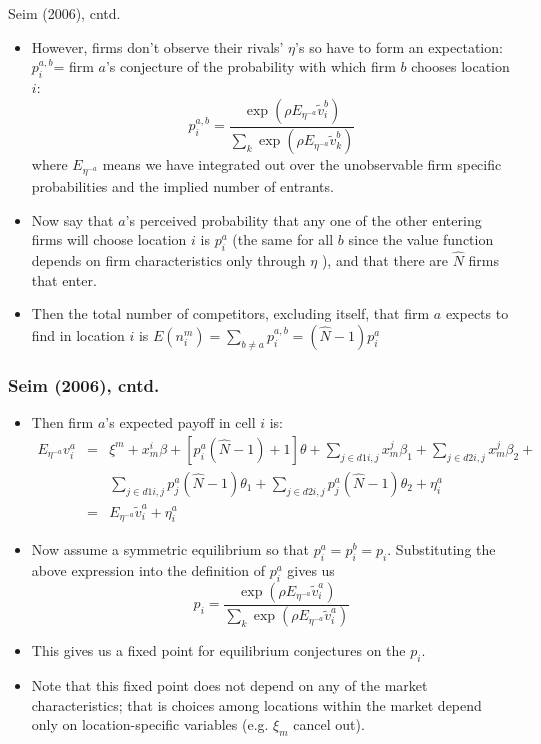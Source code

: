 \documentclass[xcolor=pdftex,dvipsnames,table,mathserif]{beamer}
\begin{document}
\begin{frame}{Seim (2006), cntd.}
\footnotesize
\begin{itemize}
\item However, firms don't observe their rivals' $\eta $'s so have to form
an expectation:\ $p_{i}^{a,b}$= firm $a$'s conjecture of the probability
with which firm $b$ chooses location $i$:%
\begin{equation*}
p_{i}^{a,b}=\frac{\exp (\rho E_{\eta ^{-a}}\tilde{v}_{i}^{b})}{\sum_{k}\exp
(\rho E_{\eta ^{-a}}\tilde{v}_{k}^{b})}
\end{equation*}%
where $E_{\eta ^{-a}}$ means we have integrated out over the unobservable
firm specific probabilities and the implied number of entrants.

\item Now say that $a$'s perceived probability that any one of the other
entering firms will choose location $i$ is $p_{i}^{a}$ (the same for all $b$
since the value function depends on firm characteristics only through $\eta $%
), and that there are $\hat{N}$ firms that enter.

\item Then the total number of competitors, excluding itself, that firm $a$
expects to find in location $i$ is $E(n_{i}^{m})=\sum_{b\neq a}p_{i}^{a,b}=(%
\hat{N}-1)p_{i}^{a}$
\end{itemize}
\end{frame}

\begin{frame}
\frametitle{Seim (2006), cntd.}
\footnotesize
\begin{itemize}
\item Then firm $a$'s expected payoff in cell $i$ is: 
\begin{eqnarray*}
E_{\eta ^{-a}}v_{i}^{a} &=&\xi ^{m}+x_{m}^{i}\beta +[p_{i}^{a}(\hat{N}%
-1)+1]\theta +\sum_{j\in d1i,j}x_{m}^{j}\beta _{1}+\sum_{j\in
d2i,j}x_{m}^{j}\beta _{2}+ \\
&&\sum_{j\in d1i,j}p_{j}^{a}(\hat{N}-1)\theta _{1}+\sum_{j\in
d2i,j}p_{j}^{a}(\hat{N}-1)\theta _{2}+\eta _{i}^{a} \\
&=&E_{\eta ^{-a}}\tilde{v}_{i}^{a}+\eta _{i}^{a}
\end{eqnarray*}

\item Now assume a symmetric equilibrium so that $p_{i}^{a}=p_{i}^{b}=p_{i}.$
Substituting the above expression into the definition of $p_{i}^{a}$ gives
us 
\begin{equation*}
p_{i}=\frac{\exp (\rho E_{\eta ^{-a}}\tilde{v}_{i}^{a})}{\sum_{k}\exp (\rho
E_{\eta ^{-a}}\tilde{v}_{i}^{a})}
\end{equation*}

\item This gives us a fixed point for equilibrium conjectures on the $p_{i}$.

\item Note that this fixed point does not depend on any of the market
characteristics; that is choices among locations within the market depend
only on location-specific variables (e.g. $\xi _{m}$ cancel out).
\end{itemize}
\end{frame}
\end{document}
